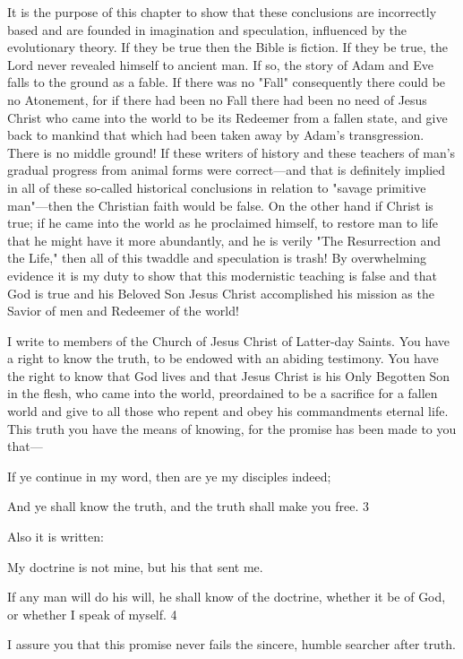 It is the purpose of this chapter to show that these conclusions are incorrectly based and are
founded in imagination and speculation, influenced by the evolutionary theory. If they be
true then the Bible is fiction. If they be true, the Lord never revealed himself to ancient man.
If so, the story of Adam and Eve falls to the ground as a fable. If there was no "Fall"
consequently there could be no Atonement, for if there had been no Fall there had been no
need of Jesus Christ who came into the world to be its Redeemer from a fallen state, and give
back to mankind that which had been taken away by Adam's transgression. There is no
middle ground! If these writers of history and these teachers of man's gradual progress from
animal forms were correct—and that is definitely implied in all of these so-called historical
conclusions in relation to "savage primitive man"—then the Christian faith would be false.
On the other hand if Christ is true; if he came into the world as he proclaimed himself, to
restore man to life that he might have it more abundantly, and he is verily "The Resurrection
and the Life," then all of this twaddle and speculation is trash! By overwhelming evidence it
is my duty to show that this modernistic teaching is false and that God is true and his
Beloved Son Jesus Christ accomplished his mission as the Savior of men and Redeemer of
the world!

I write to members of the Church of Jesus Christ of Latter-day Saints. You have a right to
know the truth, to be endowed with an abiding testimony. You have the right to know that
God lives and that Jesus Christ is his Only Begotten Son in the flesh, who came into the
world, preordained to be a sacrifice for a fallen world and give to all those who repent and
obey his commandments eternal life. This truth you have the means of knowing, for the
promise has been made to you that—

If ye continue in my word, then are ye my disciples indeed;

And ye shall know the truth, and the truth shall make you free. 3

Also it is written:

My doctrine is not mine, but his that sent me.

If any man will do his will, he shall know of the doctrine, whether it be of God, or whether I
speak of myself. 4

I assure you that this promise never fails the sincere, humble searcher after truth.

